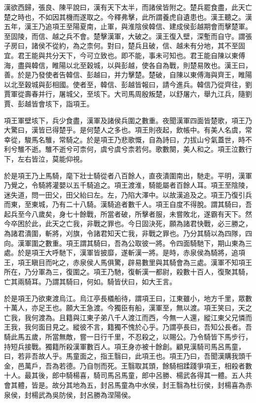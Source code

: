 漢欲西歸，張良、陳平說曰，漢有天下太半，而諸侯皆附之。楚兵罷食盡，此天亡楚之時也，不如因其機而遂取之。今釋弗擊，此所謂養虎自遺患也。漢王聽之。漢五年，漢王乃追項王至陽夏南，止軍，與淮陰侯韓信、建成侯彭越期會而擊楚軍。至固陵，而信、越之兵不會。楚擊漢軍，大破之。漢王復入壁，深塹而自守。謂張子房曰，諸侯不從約，為之柰何。對曰，楚兵且破，信、越未有分地，其不至固宜。君王能與共分天下，今可立致也。即不能，事未可知也。君王能自陳以東傅海，盡與韓信，睢陽以北至穀城，以與彭越，使各自為戰，則楚易敗也。漢王曰，善。於是乃發使者告韓信、彭越曰，并力擊楚。楚破，自陳以東傅海與齊王，睢陽以北至穀城與彭相國。使者至，韓信、彭越皆報曰，請今進兵。韓信乃從齊往，劉賈軍從壽春并行，屠城父，至垓下。大司馬周殷叛楚，以舒屠六，舉九江兵，隨劉賈、彭越皆會垓下，詣項王。

項王軍壁垓下，兵少食盡，漢軍及諸侯兵圍之數重。夜聞漢軍四面皆楚歌，項王乃大驚曰，漢皆已得楚乎。是何楚人之多也。項王則夜起，飲帳中。有美人名虞，常幸從，駿馬名騅，常騎之。於是項王乃悲歌慨，自為詩曰，力拔山兮氣蓋世，時不利兮騅不逝。騅不逝兮可柰何，虞兮虞兮柰若何。歌數闋，美人和之。項王泣數行下，左右皆泣，莫能仰視。

於是項王乃上馬騎，麾下壯士騎從者八百餘人，直夜潰圍南出，馳走。平明，漢軍乃覺之，令騎將灌嬰以五千騎追之。項王渡淮，騎能屬者百餘人耳。項王至陰陵，迷失道，問一田父，田父紿曰左。左，乃陷大澤中。以故漢追及之。項王乃復引兵而東，至東城，乃有二十八騎。漢騎追者數千人。項王自度不得脫。謂其騎曰，吾起兵至今八歲矣，身七十餘戰，所當者破，所擊者服，未嘗敗北，遂霸有天下。然今卒困於此，此天之亡我，非戰之罪也。今日固決死，願為諸君快戰，必三勝之，為諸君潰圍，斬將，刈旗，令諸君知天亡我，非戰之罪也。乃分其騎以為四隊，四向。漢軍圍之數重。項王謂其騎曰，吾為公取彼一將。令四面騎馳下，期山東為三處。於是項王大呼馳下，漢軍皆披靡，遂斬漢一將。是時，赤泉侯為騎將，追項王，項王瞋目而叱之，赤泉侯人馬俱驚，辟易數里與其騎會為三處。漢軍不知項王所在，乃分軍為三，復圍之。項王乃馳，復斬漢一都尉，殺數十百人，復聚其騎，亡其兩騎耳。乃謂其騎曰，何如。騎皆伏曰，如大王言。

於是項王乃欲東渡烏江。烏江亭長檥船待，謂項王曰，江東雖小，地方千里，眾數十萬人，亦足王也。願大王急渡。今獨臣有船，漢軍至，無以渡。項王笑曰，天之亡我，我何渡為。且籍與江東子弟八千人渡江而西，今無一人還，縱江東父兄憐而王我，我何面目見之。縱彼不言，籍獨不愧於心乎。乃謂亭長曰，吾知公長者。吾騎此馬五歲，所當無敵，嘗一日行千里，不忍殺之，以賜公。乃令騎皆下馬步行，持短兵接戰。獨籍所殺漢軍數百人。項王身亦被十餘創。顧見漢騎司馬呂馬童，曰，若非吾故人乎。馬童面之，指王翳曰，此項王也。項王乃曰，吾聞漢購我頭千金，邑萬戶，吾為若德。乃自刎而死。王翳取其頭，餘騎相蹂踐爭項王，相殺者數十人。最其後，郎中騎楊喜，騎司馬呂馬童，郎中呂勝、楊武各得其一體。五人共會其體，皆是。故分其地為五，封呂馬童為中水侯，封王翳為杜衍侯，封楊喜為赤泉侯，封楊武為吳防侯，封呂勝為涅陽侯。

